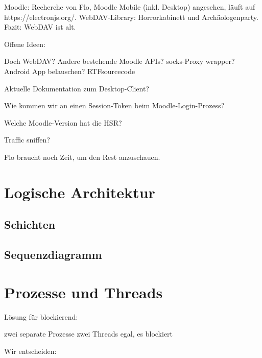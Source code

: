 \documentclass[a4paper]{article}
\let\oldsection\section
\renewcommand\section{\clearpage\oldsection}
\begin{document}
Moodle: Recherche von Flo, Moodle Mobile (inkl. Desktop) angesehen, läuft auf https://electronjs.org/. WebDAV-Library: Horrorkabinett und Archäologenparty. Fazit: WebDAV ist alt.

Offene Ideen:

Doch WebDAV?
Andere bestehende Moodle APIs?
socks-Proxy wrapper?
Android App belauschen?
RTFsourcecode

Aktuelle Dokumentation zum Desktop-Client?

Wie kommen wir an einen Session-Token beim Moodle-Login-Prozess?

Welche Moodle-Version hat die HSR?

Traffic sniffen?

Flo braucht noch Zeit, um den Rest anzuschauen.

\section{Logische Architektur}



\subsection{Schichten}

\subsection{Sequenzdiagramm}

\section{Prozesse und Threads}


Lösung für blockierend:

zwei separate Prozesse
zwei Threads
egal, es blockiert

Wir entscheiden:
\end{document}
